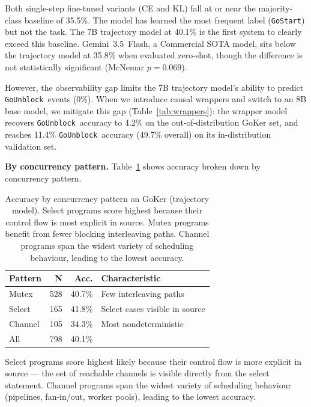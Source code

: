 \documentclass[10pt,conference]{IEEEtran}
\newcommand{\eunblock}{\texttt{GoUnblock}}
\newcommand{\estart}{\texttt{GoStart}}
\begin{document}
Both single-step fine-tuned variants (CE and KL) fall at or near the
majority-class baseline of 35.5\%.
The model has learned the most frequent label (\estart) but not the task.
The 7B trajectory model at 40.1\% is the first system to clearly exceed
this baseline.
Gemini~3.5~Flash, a Commercial SOTA model, sits
below the trajectory model at 35.8\% when evaluated zero-shot, though the difference is not statistically significant (McNemar $p{=}0.069$).

However, the observability gap limits the 7B trajectory model's ability to predict \eunblock\ events (0\%).
When we introduce causal wrappers and switch to an 8B base model, we mitigate this gap (Table~\ref{tab:wrappers}):
the wrapper model recovers \eunblock\ accuracy to 4.2\% on the out-of-distribution GoKer set, and reaches 11.4\% \eunblock\ accuracy (49.7\% overall) on its in-distribution validation set.

\textbf{By concurrency pattern.}
Table~\ref{tab:pattern} shows accuracy broken down by concurrency
pattern.

\begin{table}[t]
\centering
\caption{Accuracy by concurrency pattern on GoKer (trajectory model).
Select programs score highest because their control flow is most
explicit in source. Mutex programs benefit from fewer blocking
interleaving paths. Channel programs span the widest variety of
scheduling behaviour, leading to the lowest accuracy.}
\label{tab:pattern}
\vspace*{8pt}
\small
\begin{tabular}{@{}lrrl@{}}
\toprule
\textbf{Pattern} & \textbf{N} & \textbf{Acc.} & \textbf{Characteristic}\\
\midrule
Mutex     & 528 & 40.7\% & Few interleaving paths\\
Select    & 165 & 41.8\% & Select cases visible in source\\
Channel   & 105 & 34.3\% & Most nondeterministic\\
\bottomrule
All       & 798 & 40.1\% & \\
\bottomrule
\end{tabular}
\end{table}

Select programs score highest likely because their control flow is more
explicit in source — the set of reachable channels is visible directly
from the select statement.
Channel programs span the widest variety of scheduling behaviour
(pipelines, fan-in/out, worker pools), leading to the lowest accuracy.
\end{document}
